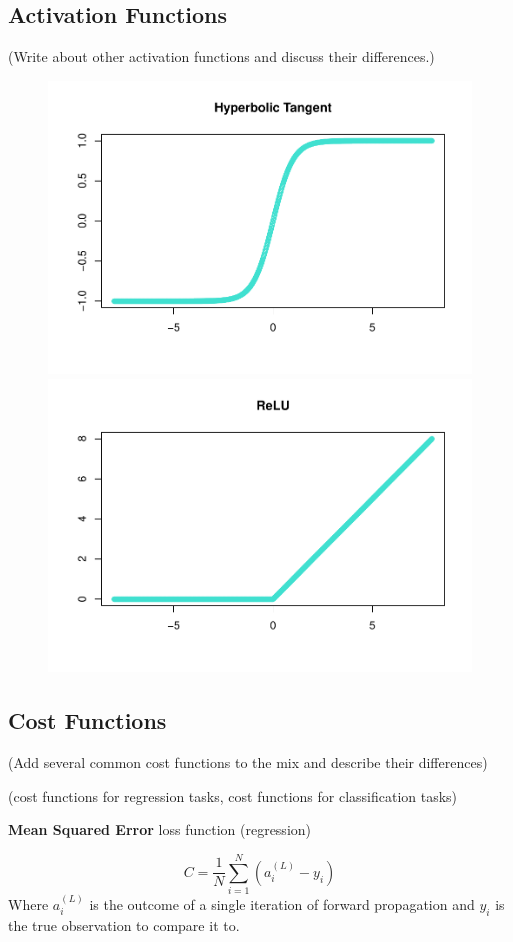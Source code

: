 
\hypertarget{activation-functions}{%
\subsection{Activation Functions}\label{activation-functions}}

(Write about other activation functions and discuss their differences.)

\begin{figure}[H]
    \includegraphics[width=0.5\linewidth]{Figures/other-activation-functions-1.pdf}
    \includegraphics[width=0.5\linewidth]{Figures/other-activation-functions-2.pdf}
    \vspace{-40pt}
\end{figure}


\hypertarget{cost-functions}{%
\subsection{Cost Functions}\label{cost-functions}}

(Add several common cost functions to the mix and describe their differences)

(cost functions for regression tasks, cost functions for classification tasks)

\textbf{Mean Squared Error} loss function (regression)

\[
C = \frac{1}{N} \sum_{i=1}^N (a^{(L)}_i - y_i)
\] Where \(a^{(L)}_i\) is the outcome of a single iteration of forward
propagation and \(y_i\) is the true observation to compare it to.

